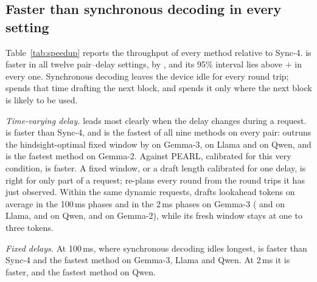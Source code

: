 \begin{table}[t]
\centering
\caption{Throughput change (\%) relative to synchronous speculative decoding (Sync-4, first row in tok/s) for every pair and added delay. Bold: fastest of the nine methods. $^\dagger$Best fixed window of the setting, chosen in hindsight. Worst: largest shortfall (\%) against the fastest method of a setting, over all twelve settings.}
\label{tab:speedup}
\footnotesize
\setlength{\tabcolsep}{3.2pt}

\end{table}

\subsection{Faster than synchronous decoding in every setting}
\label{sec:main}
Table~\ref{tab:speedup} reports the throughput of every method relative to Sync-4. \capes{} is faster in all twelve pair--delay settings, by , and its 95\% interval lies above $+$ in every one. Synchronous decoding leaves the device idle for every round trip; \cape{} spends that time drafting the next block, and spends it only where the next block is likely to be used.

\emph{Time-varying delay.} \cape{} leads most clearly when the delay changes during a request. \capes{} is  faster than Sync-4, and \cape{} is the fastest of all nine methods on every pair: \capes{} outruns the hindsight-optimal fixed window by   on Gemma-3,   on Llama and   on Qwen, and \capee{} is the fastest method on Gemma-2. Against PEARL, calibrated for this very condition, \capes{} is  faster. A fixed window, or a draft length calibrated for one delay, is right for only part of a request; \cape{} re-plans every round from the round trips it has just observed. Within the same dynamic requests, \capes{} drafts  lookahead tokens on average in the 100\,ms phases and  in the 2\,ms phases on Gemma-3 ( and  on Llama,  and  on Qwen,  and  on Gemma-2), while its fresh window stays at one to three tokens.

\emph{Fixed delays.} At 100\,ms, where synchronous decoding idles longest, \capes{} is  faster than Sync-4 and the fastest method on Gemma-3, Llama and Qwen. At 2\,ms it is  faster, and the fastest method on Qwen.

